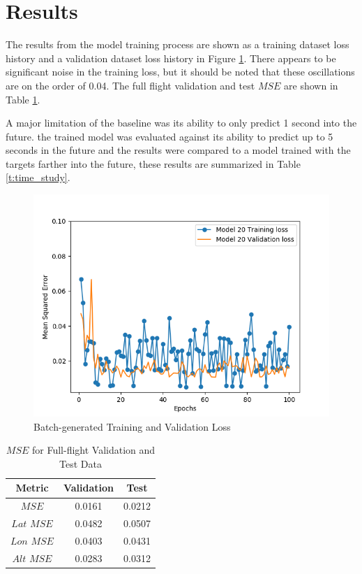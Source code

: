 \documentclass[10pt]{IEEEtran}
\begin{document}
\section{Results}
The results from the model training process are shown as a training dataset loss history and a validation dataset loss history in Figure \ref{f:loss}. There appears to be significant noise in the training loss, but it should be noted that these oscillations are on the order of 0.04. The full flight validation and test $MSE$ are shown in Table \ref{t:flight_mse}. 

A major limitation of the baseline was its ability to only predict 1 second into the future. the trained model was evaluated against its ability to predict up to 5 seconds in the future and the results were compared to a model trained with the targets farther into the future, these results are summarized in Table \ref{t:time_study}.

\begin{figure}
    \includegraphics[width=0.95\columnwidth]{training_hist.png}
    \caption{Batch-generated Training and Validation Loss}
    \label{f:loss}
\end{figure}

\begin{table}
    \caption{$MSE$ for Full-flight Validation and Test Data}
    \centering
    \begin{tabular}{ccc}
        \hline
        \textbf{Metric}&\textbf{Validation}&\textbf{Test}\\
        \hline
        $MSE$ & 0.0161& 0.0212\\
        $Lat$ $MSE$ & 0.0482& 0.0507\\
        $Lon$ $MSE$ & 0.0403& 0.0431\\
        $Alt$ $MSE$ & 0.0283& 0.0312\\
        \hline
    \end{tabular}
    \label{t:flight_mse}
\end{table}
\end{document}
